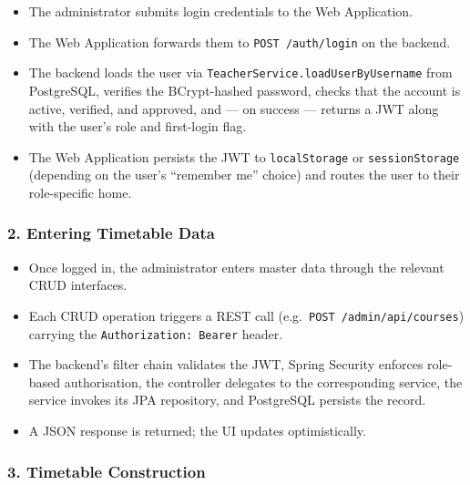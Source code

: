 \begin{itemize}
    \item The administrator submits login credentials to the Web Application.
    \item The Web Application forwards them to \texttt{POST /auth/login} on the backend.
    \item The backend loads the user via \texttt{TeacherService.loadUserByUsername} from PostgreSQL, verifies the BCrypt-hashed password, checks that the account is active, verified, and approved, and --- on success --- returns a JWT along with the user's role and first-login flag.
    \item The Web Application persists the JWT to \texttt{localStorage} or \texttt{sessionStorage} (depending on the user's ``remember me'' choice) and routes the user to their role-specific home.
\end{itemize}

\subsubsection{2. Entering Timetable Data}

\begin{itemize}
    \item Once logged in, the administrator enters master data through the relevant CRUD interfaces.
    \item Each CRUD operation triggers a REST call (e.g.\ \texttt{POST /admin/api/courses}) carrying the \texttt{Authorization: Bearer} header.
    \item The backend's filter chain validates the JWT, Spring Security enforces role-based authorisation, the controller delegates to the corresponding service, the service invokes its JPA repository, and PostgreSQL persists the record.
    \item A JSON response is returned; the UI updates optimistically.
\end{itemize}

\subsubsection{3. Timetable Construction}

